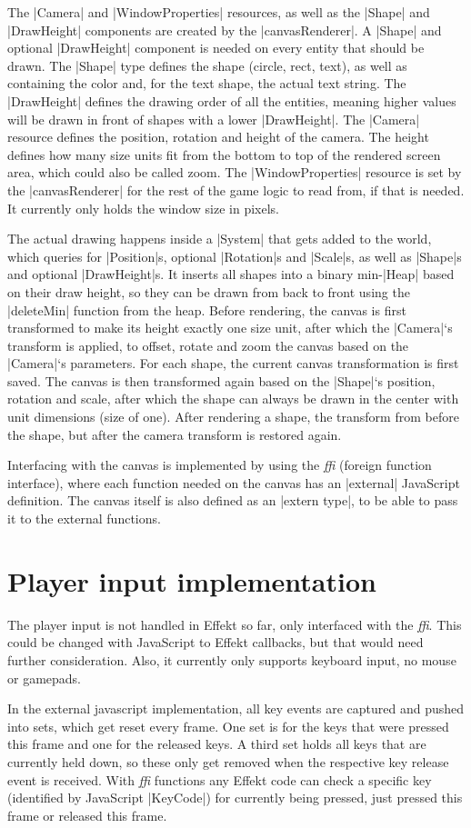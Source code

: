 The |Camera| and |WindowProperties| resources, as well as the |Shape| and |DrawHeight| components are created by the |canvasRenderer|. A |Shape| and optional |DrawHeight| component is needed on every entity that should be drawn. The |Shape| type defines the shape (circle, rect, text), as well as containing the color and, for the text shape, the actual text string. The |DrawHeight| defines the drawing order of all the entities, meaning higher values will be drawn in front of shapes with a lower |DrawHeight|. The |Camera| resource defines the position, rotation and height of the camera. The height defines how many size units fit from the bottom to top of the rendered screen area, which could also be called zoom. The |WindowProperties| resource is set by the |canvasRenderer| for the rest of the game logic to read from, if that is needed. It currently only holds the window size in pixels.

The actual drawing happens inside a |System| that gets added to the world, which queries for |Position|s, optional |Rotation|s and |Scale|s, as well as |Shape|s and optional |DrawHeight|s. It inserts all shapes into a binary min-|Heap| based on their draw height, so they can be drawn from back to front using the |deleteMin| function from the heap. Before rendering, the canvas is first transformed to make its height exactly one size unit, after which the |Camera|`s transform is applied, to offset, rotate and zoom the canvas based on the |Camera|`s parameters. For each shape, the current canvas transformation is first saved. The canvas is then transformed again based on the |Shape|`s position, rotation and scale, after which the shape can always be drawn in the center with unit dimensions (size of one). After rendering a shape, the transform from before the shape, but after the camera transform is restored again.

Interfacing with the canvas is implemented by using the \textit{ffi} (foreign function interface), where each function needed on the canvas has an |external| JavaScript definition. The canvas itself is also defined as an |extern type|, to be able to pass it to the external functions.

\section{Player input implementation}

The player input is not handled in Effekt so far, only interfaced with the \textit{ffi}. This could be changed with JavaScript to Effekt callbacks, but that would need further consideration. Also, it currently only supports keyboard input, no mouse or gamepads.

In the external javascript implementation, all key events are captured and pushed into sets, which get reset every frame. One set is for the keys that were pressed this frame and one for the released keys. A third set holds all keys that are currently held down, so these only get removed when the respective key release event is received. With \textit{ffi} functions any Effekt code can check a specific key (identified by JavaScript |KeyCode|) for currently being pressed, just pressed this frame or released this frame.
